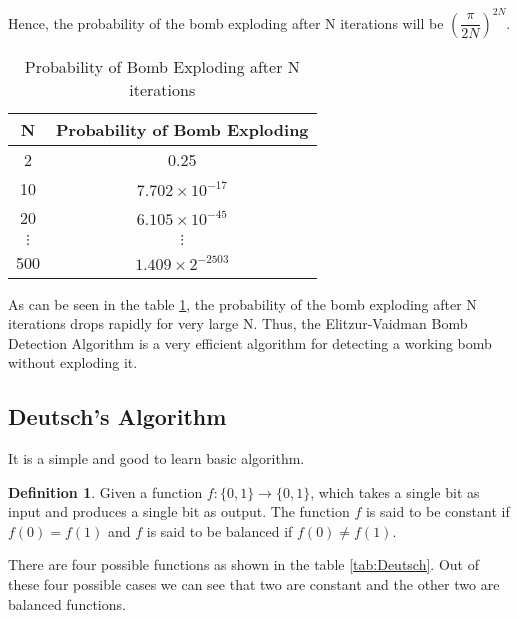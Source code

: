 \documentclass[12pt, oneside]{book}
\theoremstyle{definition}
\newtheorem{definition}{Definition}[section]
\theoremstyle{definition}
\theoremstyle{remark}
\begin{document}
\begin{enumerate}
    Hence, the probability of the bomb exploding after N iterations will be $\left(\dfrac{\pi}{2N}\right)^{2N}$.
    \begin{table}[H]
        \centering
        \begin{tabular}{|c|c|}
            \hline
            N & Probability of Bomb Exploding \\
            \hline
            2 & 0.25 \\
            10 & $7.702 \times 10^{-17}$  \\
            20 & $6.105 \times 10^{-45}$ \\
            $\vdots$ & $\vdots$ \\
            500 & $1.409 \times 2^{-2503}$ \\
            \hline
        \end{tabular}
        \caption{Probability of Bomb Exploding after N iterations}
        \label{tab:Prob}
    \end{table}
    As can be seen in the table \ref{tab:Prob}, the probability of the bomb exploding after N iterations drops rapidly for very large N. Thus, the Elitzur-Vaidman Bomb Detection Algorithm is a very efficient algorithm for detecting a working bomb without exploding it.
\end{enumerate}

\subsection{Deutsch's Algorithm}
It is a simple and good to learn basic algorithm.
\begin{definition}
    Given a function $f:\{0,1\}\rightarrow\{0,1\}$, which takes a single bit as input and 
    produces a single bit as output. The function $f$ is said to be constant if $f(0)=f(1)$ and $f$ is said to be balanced if $f(0)\neq f(1)$.
\end{definition}

There are four possible functions as shown in the table \ref{tab:Deutsch}. Out of these four possible cases we can see that two are constant and the other two are balanced functions.
\end{document}
